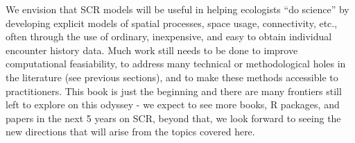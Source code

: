 We envision that SCR models will be useful in helping
ecologists ``do science'' by developing explicit models of spatial
processes, space usage, connectivity, etc., often through the use of ordinary, 
inexpensive, and
easy to obtain individual encounter history data. Much work still needs to
be done to improve computational feasiability, to address many
technical or methodological holes in the literature (see previous
sections), and to make these methods accessible to practitioners.
This book is just the beginning and there are many frontiers still
left to explore on this odyssey - we expect to see more books, R packages,
and papers in the next 5 years on SCR, beyond that, we look forward to seeing
the new directions that will arise from the topics covered here.  

















